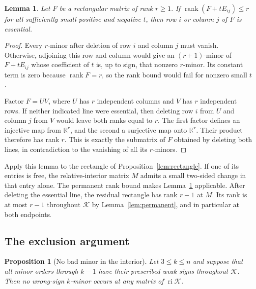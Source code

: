 \documentclass[10pt,a4paper]{article}
\newtheorem{lemma}[theorem]{Lemma}
\newtheorem{proposition}[theorem]{Proposition}
\theoremstyle{definition}
\theoremstyle{remark}
\numberwithin{equation}{section}
\newcommand{\R}{\mathbb R}
\newcommand{\K}{\mathcal K}
\DeclareMathOperator{\rank}{rank}
\DeclareMathOperator{\ri}{ri}
\begin{document}
\begin{lemma}\label{lem:essential}
Let $F$ be a rectangular matrix of rank $r\geq1$.
If $\rank(F+tE_{ij})\leq r$ for all sufficiently small positive
and negative $t$, then row $i$ or column $j$ of $F$ is essential.
\end{lemma}

\begin{proof}
Every $r$-minor after deletion of row $i$ and column $j$ must
vanish. Otherwise, adjoining this row and column would give an
$(r+1)$-minor of $F+tE_{ij}$ whose coefficient of $t$ is, up to
sign, that nonzero $r$-minor. Its constant term is zero because
$\rank F=r$, so the rank bound would fail for nonzero small $t$.

Factor $F=UV$, where $U$ has $r$ independent columns and $V$
has $r$ independent rows. If neither indicated line were essential,
then deleting row $i$ from $U$ and column $j$ from $V$ would
leave both ranks equal to $r$. The first factor defines an
injective map from $\R^r$, and the second a surjective map onto
$\R^r$. Their product therefore has rank $r$. This is exactly
the submatrix of $F$ obtained by deleting both lines, in
contradiction to the vanishing of all its $r$-minors.
\end{proof}

Apply this lemma to the rectangle of Proposition~\ref{lem:rectangle}.
If one of its entries is free, the relative-interior matrix $M$
admits a small two-sided change in that entry alone. The permanent
rank bound makes Lemma~\ref{lem:essential} applicable. After
deleting the essential line, the residual rectangle has rank
$r-1$ at $M$. Its rank is at most $r-1$ throughout $\K$ by
Lemma~\ref{lem:permanent}, and in particular at both endpoints.


\subsection{The exclusion argument}\label{sec:exclusion}
\begin{proposition}[No bad minor in the interior]\label{prop:exclude}
Let $3\leq k\leq n$ and suppose that all minor orders through $k-1$
have their prescribed weak signs throughout $\K$. Then no wrong-sign
$k$-minor occurs at any matrix of $\ri\K$.
\end{proposition}
\end{document}
